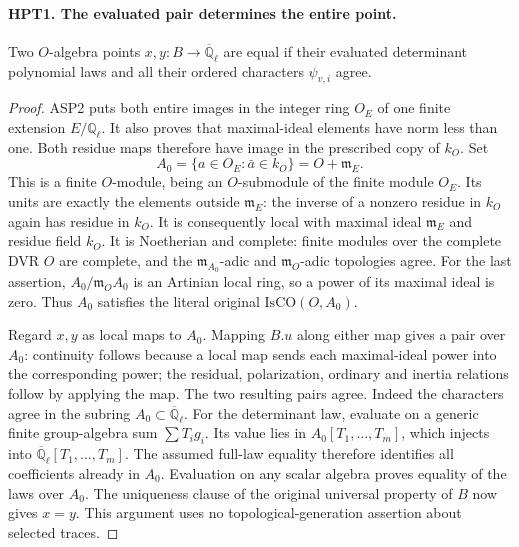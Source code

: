 \paragraph{HPT1. The evaluated pair determines the entire point.}
\label{claim:HPT1}
Two $O$-algebra points $x,y:B\to\overline{\mathbb Q}_\ell$ are equal
if their evaluated determinant polynomial laws and all their ordered
characters $\psi_{v,i}$ agree.
\begin{proof}
ASP2 puts both entire images in the integer ring $O_E$ of one finite
extension $E/\mathbb Q_\ell$.  It also proves that maximal-ideal
elements have norm less than one.  Both residue maps therefore have
image in the prescribed copy of $k_O$.  Set
\[
                A_0=\{a\in O_E:\bar a\in k_O\}=O+\mathfrak m_E.
\]
This is a finite $O$-module, being an $O$-submodule of the finite
module $O_E$.  Its units are exactly the elements outside
$\mathfrak m_E$: the inverse of a nonzero residue in $k_O$ again
has residue in $k_O$.  It is consequently local with maximal ideal
$\mathfrak m_E$ and residue field $k_O$.  It is Noetherian and
complete: finite modules over the complete DVR $O$ are complete,
and the $\mathfrak m_{A_0}$-adic and $\mathfrak m_O$-adic topologies
agree.  For the last assertion, $A_0/\mathfrak m_OA_0$ is an
Artinian local ring, so a power of its maximal ideal is zero.
Thus $A_0$ satisfies the literal original $\mathrm{IsCO}(O,A_0)$.

Regard $x,y$ as local maps to $A_0$.  Mapping $B.u$ along either
map gives a pair over $A_0$: continuity follows because a local
map sends each maximal-ideal power into the corresponding power;
the residual, polarization, ordinary and inertia relations follow
by applying the map.  The two resulting pairs agree.  Indeed the
characters agree in the subring $A_0\subset\overline{\mathbb Q}_\ell$.
For the determinant law, evaluate on a generic finite group-algebra
sum $\sum T_i g_i$.  Its value lies in $A_0[T_1,\ldots,T_m]$,
which injects into $\overline{\mathbb Q}_\ell[T_1,\ldots,T_m]$.
The assumed full-law equality therefore identifies all coefficients
already in $A_0$.  Evaluation on any scalar algebra proves equality
of the laws over $A_0$.  The uniqueness clause of the original
universal property of $B$ now gives $x=y$.  This argument uses no
topological-generation assertion about selected traces.
\end{proof}

